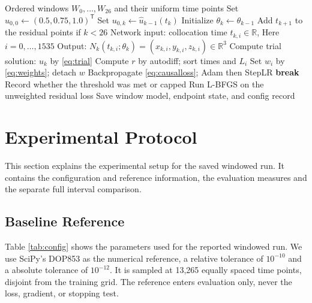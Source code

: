 \documentclass[conference]{IEEEtran}
\begin{document}
\begin{algorithm}[t]
\caption{Sequential causal window training}
\label{alg:training}
\begin{algorithmic}[1]
\Require Ordered windows $W_0,\ldots,W_{26}$ and their uniform time points
\State Set $u_{0,0}\gets (0.5,0.75,1.0)^\mathsf{T}$
    \State Set $u_{0,k}\gets\hat{u}_{k-1}(t_k)$
    \State Initialize $\theta_k\gets\theta_{k-1}$
  \EndIf
  \State Add $t_{k+1}$ to the residual points if $k<26$
      \State Network input: collocation time $t_{k,i}\in\mathbb{R}$, 
        \State Here  $i=0,\ldots,1535$
      \State Output: $N_k(t_{k,i};\theta_k)=(x_{k,i},y_{k,i},z_{k,i})\in\mathbb{R}^3$
      \State Compute trial solution: $u_k$ by \eqref{eq:trial}
      \State Compute $r$ by autodiff; sort times and $L_i$
      \State Set $w_i$ by \eqref{eq:weights}; detach $w$
      \State Backpropagate \eqref{eq:causalloss}; Adam then StepLR
        \State \textbf{break}
      \EndIf
    \EndFor
    \State Record whether the threshold was met or capped
  \EndFor
  \State Run L-BFGS on the unweighted residual loss
  \State Save window model, endpoint state, and config record
\EndFor
\end{algorithmic}
\end{algorithm}

\section{Experimental Protocol}
This section explains the experimental setup for the saved windowed run. It contains the configuration and reference information, the evaluation measures and the separate full interval comparison.




\subsection{Baseline Reference}




Table \ref{tab:config} shows the parameters used for the reported windowed run. We use SciPy’s DOP853 \cite{virtanen2020} as the numerical reference, a relative tolerance of $10^{-10}$ and a absolute tolerance of $10^{-12}$. It is sampled at 13,265 equally spaced time points, disjoint from the training grid. The reference enters evaluation only, never the loss, gradient, or stopping test.
\end{document}
